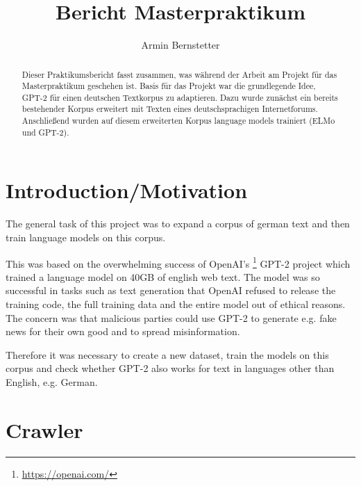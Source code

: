 \documentclass{scrartcl}
\begin{document}

\title{Bericht Masterpraktikum}

\author{Armin Bernstetter}

\maketitle

\begin{abstract}
Dieser Praktikumsbericht fasst zusammen, was während der Arbeit am Projekt für das Masterpraktikum geschehen ist. Basis für das Projekt war die grundlegende Idee, GPT-2 für einen deutschen Textkorpus zu adaptieren. Dazu wurde zunächst ein bereits bestehender Korpus erweitert mit Texten eines deutschsprachigen Internetforums. Anschließend wurden auf diesem erweiterten Korpus language models trainiert (ELMo und GPT-2).
\end{abstract}





\section{Introduction/Motivation}

The general task of this project was to expand a corpus of german text and then train language models on this corpus.

This was based on the overwhelming success of OpenAI's \footnote{\url{https://openai.com/}} GPT-2 project \cite{radford2019language} which trained a language model on 40GB of english web text. The model was so successful in tasks such as text generation that OpenAI refused to release the training code, the full training data and the entire model out of ethical reasons. The concern was that malicious parties could use GPT-2 to generate e.g. fake news for their own good and to spread misinformation.

Therefore it was necessary to create a new dataset, train the models on this corpus and check whether GPT-2 also works for text in languages other than English, e.g. German.


\section{Crawler}
\end{document}
